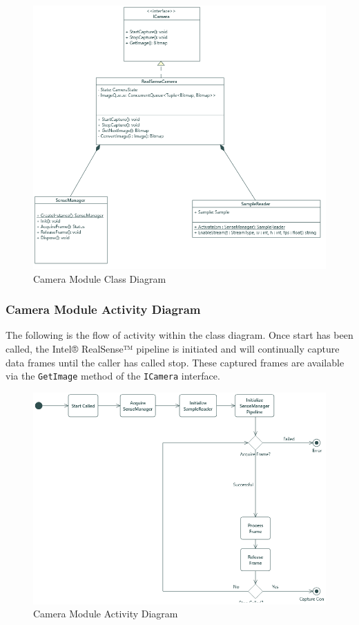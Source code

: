 \documentclass[12pt]{article}
\begin{document}
\begin{figure}
\centering
\includegraphics{Figures/CameraModuleClass.png}
\caption{Camera Module Class Diagram}
\end{figure}

\subsubsection{Camera Module Activity
Diagram}\label{camera-module-activity-diagram}

The following is the flow of activity within the class diagram. Once
start has been called, the Intel® RealSense™ pipeline is initiated and
will continually capture data frames until the caller has called stop.
These captured frames are available via the \texttt{GetImage} method of
the \texttt{ICamera} interface.

\begin{figure}
\centering
\includegraphics{Figures/CameraModuleActivity.png}
\caption{Camera Module Activity Diagram}
\end{figure}
\end{document}
